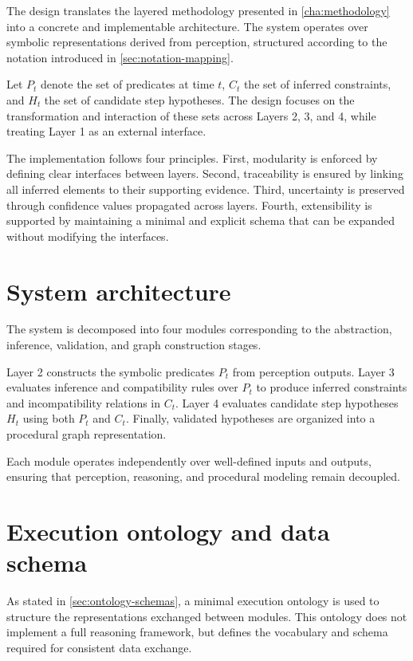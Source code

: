 \documentclass[11pt,titlepage,openright]{book}
\begin{document}
The design translates the layered methodology presented in \cref{cha:methodology} into a concrete and implementable architecture. The system operates over symbolic representations derived from perception, structured according to the notation introduced in \cref{sec:notation-mapping}.

Let $P_t$ denote the set of predicates at time $t$, $C_t$ the set of inferred constraints, and $H_t$ the set of candidate step hypotheses. The design focuses on the transformation and interaction of these sets across Layers 2, 3, and 4, while treating Layer 1 as an external interface.

The implementation follows four principles. First, modularity is enforced by defining clear interfaces between layers. Second, traceability is ensured by linking all inferred elements to their supporting evidence. Third, uncertainty is preserved through confidence values propagated across layers. Fourth, extensibility is supported by maintaining a minimal and explicit schema that can be expanded without modifying the interfaces.

\section{System architecture}

The system is decomposed into four modules corresponding to the abstraction, inference, validation, and graph construction stages.

Layer 2 constructs the symbolic predicates $P_t$ from perception outputs. Layer 3 evaluates inference and compatibility rules over $P_t$ to produce inferred constraints and incompatibility relations in $C_t$. Layer 4 evaluates candidate step hypotheses $H_t$ using both $P_t$ and $C_t$. Finally, validated hypotheses are organized into a procedural graph representation.

Each module operates independently over well-defined inputs and outputs, ensuring that perception, reasoning, and procedural modeling remain decoupled.

\section{Execution ontology and data schema}

As stated in \cref{sec:ontology-schemas}, a minimal execution ontology is used to structure the representations exchanged between modules. This ontology does not implement a full reasoning framework, but defines the vocabulary and schema required for consistent data exchange.
\end{document}
